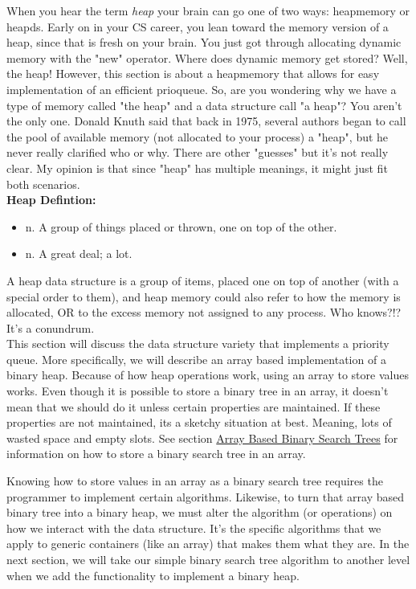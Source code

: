 \newpage
{}

When you hear the term \textit{heap} your brain can go one of two ways: \gls{heapmemory} or \gls{heapds}. Early on in your CS career, you lean toward the memory version of a heap, since that is fresh on your brain. You just got through allocating dynamic memory with the "new" operator. Where does dynamic memory get stored? Well, the heap! However, this section is about a \gls{heapmemory} that allows for easy implementation of an efficient \gls{prioqueue}. So, are you wondering why we have a type of memory called "the heap" and a data structure call "a heap"? You aren't the only one. Donald Knuth said that back in 1975, several authors began to call the pool of available memory (not allocated to your process) a "heap", but he never really clarified who or why. There are other "guesses" but it's not really clear. My opinion is that since "heap" has multiple meanings, it might just fit both scenarios.\\

\textbf{Heap Defintion:}
\begin{itemize}
	\tightlist
	\item n.	A group of things placed or thrown, one on top of the other.
	\item n.	A great deal; a lot.
\end{itemize}

A heap data structure is a group of items, placed one on top of another (with a special order to them), and heap memory could also refer to how the memory is allocated, OR to the excess memory not assigned to any process. Who knows?!? It's a conundrum.\\

This section will discuss the data structure variety that implements a priority queue. More specifically, we will describe an array based implementation of a binary heap. Because of how heap operations work, using an array to store values works. Even though it is possible to store a binary tree in an array, it doesn't mean that we should do it unless certain properties are maintained. If these properties are not maintained, its a sketchy situation at best. Meaning, lots of wasted space and empty slots. See section \hyperlink{abbst}{Array Based Binary Search Trees} for information on how to store a binary search tree in an array. 


Knowing how to store values in an array as a binary search tree requires the programmer to implement certain algorithms. Likewise, to turn that array based binary tree into a binary heap, we must alter the algorithm (or operations) on how we interact with the data structure. It's the specific algorithms that we apply to generic containers (like an array) that makes them what they are. In the next section, we will take our simple binary search tree algorithm to another level when we add the functionality to implement a binary heap.\\

